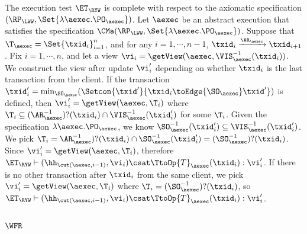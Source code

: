 The execution test $\ET_{\RYW}$ is complete with respect to 
the axiomatic specification $(\RP_{\LWW}, \Set{\lambda \aexec.\PO_{\aexec} })$. 
Let $\aexec$ be an abstract execution that satisfies the specification
$\CMa(\RP_{\LWW}, \Set{\lambda \aexec.\PO_{\aexec} })$.
Suppose that $\T_{\aexec} = \Set{\txid_{i}}_{i=1}^{n}$, and for any $i=1,\cdots, n-1$,
$\txid_{i} \xrightarrow{\AR_{\aexec}} \txid_{i+1}$.
Fix $i=1,\cdots,n$, and let a view $\vi_{i} = \getView(\aexec, \VIS^{-1}_{\aexec}(\txid_{i}))$.
We construct the view after update \( \vi'_i\) depending on whether \( \txid_i \) is the last transaction from the client.
If the transaction \( \txid'_i = \min_{\SO_\aexec}(\Setcon{\txid'}{\txid_i \toEdge{\SO_\aexec} \txid' } ) \)  is defined,
then \( \vi'_i = \getView(\aexec, \T_i) \) where \( \T_i \subseteq (\AR_{\aexec}^{-1})?(\txid_i) \cap \VIS_\aexec^{-1}(\txid'_i) \) for some \( \T_i \).
Given the specification \( \lambda \aexec.\PO_{\aexec} \), 
we know \( \SO_\aexec^{-1}(\txid'_i) \subseteq \VIS_\aexec^{-1}(\txid'_i) \).
We pick \( \T_i = \AR_\aexec^{-1})?(\txid_i) \cap \SO_\aexec^{-1}(\txid'_i) = (\SO_\aexec^{-1})?(\txid_i) \).
Since \( \vi'_i = \getView(\aexec, \T_i) \), therefore \( \ET_\RYW \vdash (\hh_{\cut(\aexec, i-1)}, \vi_i) \csat \TtoOp{T}_{\aexec}(\txid_{i}) : \vi'_{i} \).
If there is no other transaction after \( \txid_i \) from the same client,
we pick \( \vi'_i = \getView(\aexec, \T_i) \) where \( \T_i = (\SO_\aexec^{-1})?(\txid_i) \),
so \( \ET_\RYW \vdash (\hh_{\cut(\aexec, i-1)}, \vi_i) \csat \TtoOp{T}_{\aexec}(\txid_{i}) : \vi'_{i} \).

\subsection{ \( \WFR \) }

